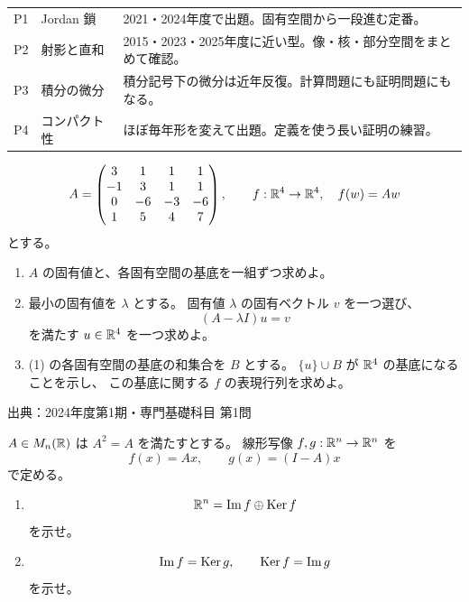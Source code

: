 
\begin{pointbox}[選定理由]
\begin{tabular}{@{}p{12mm}p{42mm}p{100mm}@{}}
P1 & Jordan 鎖 & 2021・2024年度で出題。固有空間から一段進む定番。\\
P2 & 射影と直和 & 2015・2023・2025年度に近い型。像・核・部分空間をまとめて確認。\\
P3 & 積分の微分 & 積分記号下の微分は近年反復。計算問題にも証明問題にもなる。\\
P4 & コンパクト性 & ほぼ毎年形を変えて出題。定義を使う長い証明の練習。\\
\end{tabular}
\end{pointbox}


\[
A=\begin{pmatrix}
3&1&1&1\\
-1&3&1&1\\
0&-6&-3&-6\\
1&5&4&7
\end{pmatrix},
\qquad f:\mathbb R^4\to\mathbb R^4,\quad f(w)=Aw
\]
とする。

\begin{enumerate}
  \item \(A\) の固有値と、各固有空間の基底を一組ずつ求めよ。
  \item 最小の固有値を \(\lambda\) とする。
  固有値 \(\lambda\) の固有ベクトル \(v\) を一つ選び、
  \[
  (A-\lambda I)u=v
  \]
  を満たす \(u\in\mathbb R^4\) を一つ求めよ。
  \item (1) の各固有空間の基底の和集合を \(B\) とする。
  \(\{u\}\cup B\) が \(\mathbb R^4\) の基底になることを示し、
  この基底に関する \(f\) の表現行列を求めよ。
\end{enumerate}

\vfill
{\small\color{muted}出典：2024年度第1期・専門基礎科目 第1問}


\(A\in M_n(\mathbb R)\) は \(A^2=A\) を満たすとする。
線形写像 \(f,g:\mathbb R^n\to\mathbb R^n\) を
\[
f(x)=Ax,\qquad g(x)=(I-A)x
\]
で定める。

\begin{enumerate}
  \item
  \[
  \mathbb R^n=\operatorname{Im} f\oplus\operatorname{Ker} f
  \]
  を示せ。
  \item
  \[
  \operatorname{Im} f=\operatorname{Ker} g,\qquad \operatorname{Ker} f=\operatorname{Im} g
  \]
  を示せ。
\end{enumerate}

